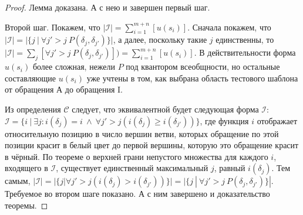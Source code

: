 \begin{proof}
   Лемма доказана. А с нею и завершен первый шаг.

   Второй шаг. Покажем, что $|\mathcal{I}| = \sum_{i=1}^{m+n} [u(s_i)]$. Сначала покажем, что $|\mathcal{I}| = |\{ j ~|~ \forall j' {>} j ~ P(\delta_j, \delta_{j'}) \}|$, а далее, поскольку такие $j$ единственны, то $|\mathcal{I}| = \sum_j [\forall j' {>} j ~ P(\delta_j, \delta_{j'})]) =  \sum_{i=1}^{m+n} [u(s_i)]$. В действительности форма $u(s_i)$ более сложная, нежели $P$ под квантором всеобщности, но остальные составляющие $u(s_i)$ уже учтены в том, как выбрана область тестового шаблона от обращения А до обращения I.

   Из определения $\mathcal{C}$ следует, что эквивалентной будет следующая форма $\mathcal{I}$: $\mathcal{I} = \{i ~|~ \exists j : i(\delta_j) = i ~\wedge~ \forall j' > j ( i(\delta_j) \geqslant i(\delta_{j'}) ) \}$, где функция $i$ отображает относительную позицию в число вершин ветви, которых обращение по этой позиции красит в белый цвет до первой вершины, которую это обращение красит в чёрный. По теореме о верхней грани непустого множества для каждого $i$, входящего в $\mathcal{I}$, существует единственный максимальный $j$, равный $i(\delta_j)$. Тем самым, $|\mathcal{I}| = |\{j | \forall j' > j ( i(\delta_j) > i(\delta_{j'}) ) \}| = |\{ j ~|~ \forall j' {>} j ~ P(\delta_j, \delta_{j'}) \}|$. Требуемое во втором шаге показано. А с ним завершено и доказательство теоремы.
\end{proof} 